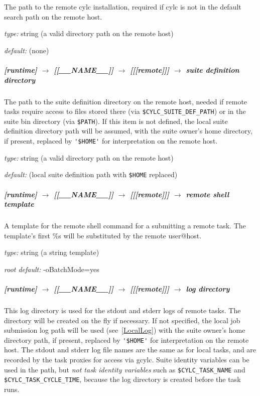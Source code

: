 The path to the remote cylc installation, required if cylc
is not in the default search path on the remote host.

\begin{myitemize}
\item {\em type:} string (a valid directory path on the remote host)
\item {\em default:} (none)
\end{myitemize}

\subparagraph[suite definition directory]{[runtime] $\rightarrow$ [[\_\_NAME\_\_]] $\rightarrow$ [[[remote]]] $\rightarrow$  suite definition directory}

The path to the suite definition directory on the remote host, needed if
remote tasks require access to files stored there (via
\lstinline=$CYLC_SUITE_DEF_PATH=) or in the suite bin directory (via
\lstinline=$PATH=).  If this item is not defined, the local suite
definition directory path will be assumed, with the suite owner's home
directory, if present, replaced by \lstinline='$HOME'= for
interpretation on the remote host. 

\begin{myitemize}
\item {\em type:} string (a valid directory path on the remote host)
\item {\em default:} (local suite definition path with \lstinline=$HOME=
    replaced)
\end{myitemize}
 
\subparagraph[remote shell template]{[runtime] $\rightarrow$ [[\_\_NAME\_\_]] $\rightarrow$ [[[remote]]] $\rightarrow$ remote shell template }

A template for the remote shell command for a submitting a remote task.
The template's first \%s will be substituted by the remote user@host.

\begin{myitemize}
\item {\em type:} string (a string template)
\item {\em root default:} \lstinline@ssh -oBatchMode=yes %s@
\end{myitemize}

\subparagraph[log directory]{[runtime] $\rightarrow$ [[\_\_NAME\_\_]] $\rightarrow$ [[[remote]]] $\rightarrow$ log directory }

This log directory is used for the stdout and stderr logs of remote
tasks. The directory will be created on the fly if necessary. If not
specified, the local job submission log path will be used
(see~\ref{LocalLog}) with the
suite owner's home directory path, if present, replaced by
\lstinline='$HOME'= for interpretation on the remote host. The stdout
and stderr log file names are the same as for local tasks, and are
recorded by the task proxies for access via gcylc. Suite identity
variables can be used in the path, but {\em not task identity variables}
such as \lstinline=$CYLC_TASK_NAME= and \lstinline=$CYLC_TASK_CYCLE_TIME=, 
because the log directory is created before the task runs.

